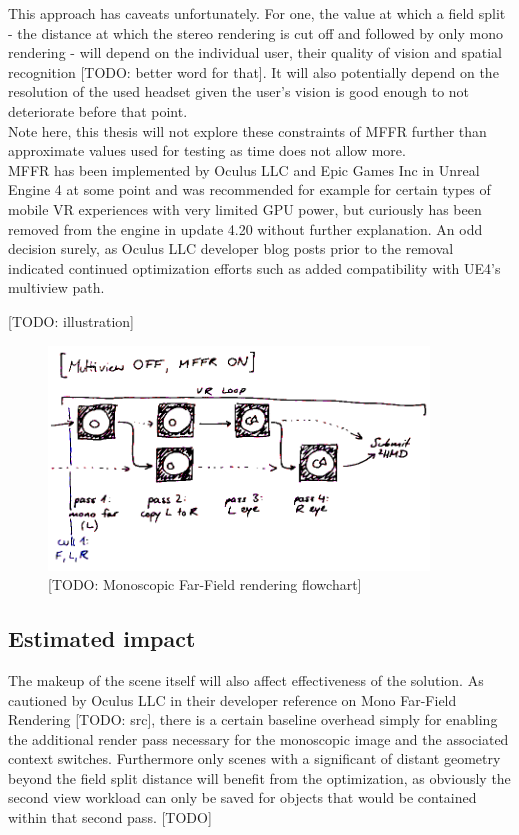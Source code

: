 This approach has caveats unfortunately. For one, the value at which a field split - the distance at which the stereo rendering is cut off and followed by only mono rendering - will depend on the individual user, their quality of vision and spatial recognition [TODO: better word for that]. It will also potentially depend on the resolution of the used headset given the user's vision is good enough to not deteriorate before that point. \\
Note here, this thesis will not explore these constraints of MFFR further than approximate values used for testing as time does not allow more. \\
MFFR has been implemented by Oculus LLC and Epic Games Inc in Unreal Engine 4 at some point and was recommended for example for certain types of mobile VR experiences with very limited GPU power, but curiously has been removed from the engine in update 4.20 without further explanation. An odd decision surely, as Oculus LLC developer blog posts prior to the removal indicated continued optimization efforts such as added compatibility with UE4's multiview path. 

[TODO: illustration]
\begin{figure}[htpb]
  \centering
  \includegraphics[width=0.9\textwidth]{pictures/flowchart_mffr}
  \caption{[TODO: Monoscopic Far-Field rendering flowchart]} \label{fig:flowchart_mffr_FarFirst}
\end{figure}

\subsection{Estimated impact}
The makeup of the scene itself will also affect effectiveness of the solution. As cautioned by Oculus LLC in their developer reference on Mono Far-Field Rendering [TODO: src], there is a certain baseline overhead simply for enabling the additional render pass necessary for the monoscopic image and the associated context switches. Furthermore only scenes with a significant of distant geometry beyond the field split distance will benefit from the optimization, as obviously the second view workload can only be saved for objects that would be contained within that second pass. 
[TODO]

